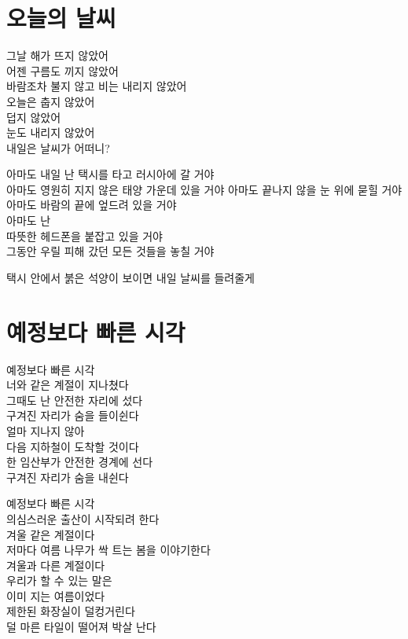 \begin{article}
\hypertarget{uxc624uxb298uxc758-uxb0a0uxc528}{%
\chapter{오늘의 날씨}\label{uxc624uxb298uxc758-uxb0a0uxc528}}

그날 해가 뜨지 않았어\\
어젠 구름도 끼지 않았어\\
바람조차 불지 않고 비는 내리지 않았어\\
오늘은 춥지 않았어\\
덥지 않았어\\
눈도 내리지 않았어\\
내일은 날씨가 어떠니?

아마도 내일 난 택시를 타고 러시아에 갈 거야\\
아마도 영원히 지지 않은 태양 가운데 있을 거야 아마도 끝나지 않을 눈 위에 묻힐 거야\\
아마도 바람의 끝에 엎드려 있을 거야\\
아마도 난\\
따뜻한 헤드폰을 붙잡고 있을 거야\\
그동안 우릴 피해 갔던 모든 것들을 놓칠 거야

택시 안에서 붉은 석양이 보이면 내일 날씨를 들려줄게
\end{article}

\begin{article}
\hypertarget{uxc608uxc815uxbcf4uxb2e4-uxbe60uxb978-uxc2dcuxac01}{%
\chapter{예정보다 빠른 시각}\label{uxc608uxc815uxbcf4uxb2e4-uxbe60uxb978-uxc2dcuxac01}}

예정보다 빠른 시각\\
너와 같은 계절이 지나쳤다\\
그때도 난 안전한 자리에 섰다\\
구겨진 자리가 숨을 들이쉰다\\
얼마 지나지 않아\\
다음 지하철이 도착할 것이다\\
한 임산부가 안전한 경계에 선다\\
구겨진 자리가 숨을 내쉰다

예정보다 빠른 시각\\
의심스러운 출산이 시작되려 한다\\
겨울 같은 계절이다\\
저마다 여름 나무가 싹 트는 봄을 이야기한다\\
겨울과 다른 계절이다\\
우리가 할 수 있는 말은\\
이미 지는 여름이었다\\
제한된 화장실이 덜컹거린다\\
덜 마른 타일이 떨어져 박살 난다
\end{article}

